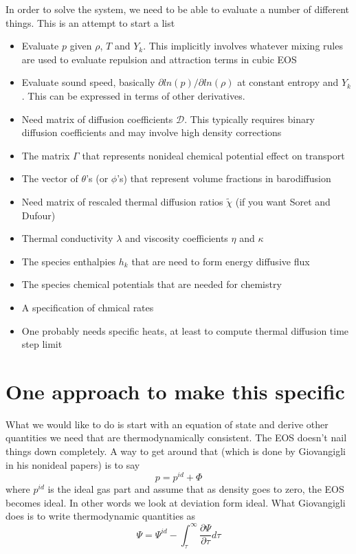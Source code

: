 \documentclass[11pt]{article}
\begin{document}
In order to solve the system, we need to be able to evaluate a number of different things.
This is an attempt to start a list
\begin{itemize}
\item Evaluate $p$ given $\rho$, $T$ and $Y_k$. This implicitly involves whatever mixing rules are used to
evaluate repulsion and attraction terms in cubic EOS
\item Evaluate sound speed, basically $\partial ln(p)/ \partial ln(\rho)$ at constant entropy and $Y_k$. This
can be expressed in terms of other derivatives.
\item Need matrix of diffusion coefficients $\mathcal{D}$.  This typically requires binary diffusion coefficients and may involve high density corrections
\item The matrix $\Gamma$ that represents nonideal chemical potential effect on transport
\item The vector of $\theta$'s (or $\phi$'s) that represent volume fractions in barodiffusion
\item Need matrix of rescaled thermal diffusion ratios $\tilde{\chi}$ (if you want Soret and Dufour)
\item Thermal conductivity $\lambda$ and viscosity coefficients $\eta$ and $\kappa$
\item The species enthalpies $h_k$ that are need to form energy diffusive flux
\item The species chemical potentials that are needed for chemistry
\item A specification of chmical rates
\item One probably needs specific heats, at least to compute thermal diffusion time step limit
\end{itemize}

\section{One approach to make this specific}

What we would like to do is start with an equation of state and derive other quantities we need that
are thermodynamically consistent.  The EOS doesn't nail things down completely.  A way to get around that
(which is done by Giovangigli in his nonideal papers) is to
say
\[
p = p^{id} + \Phi
\]
where $p^{id}$ is the ideal gas part and assume that as density goes to zero, the EOS becomes
ideal.  In other words we look at deviation form ideal.
What Giovangigli does is to write thermodynamic quantities as
\[
\Psi = \Psi^{id} - \int_\tau^\infty \frac{\partial \Psi}{\partial \tau} d \tau
\]
\end{document}

